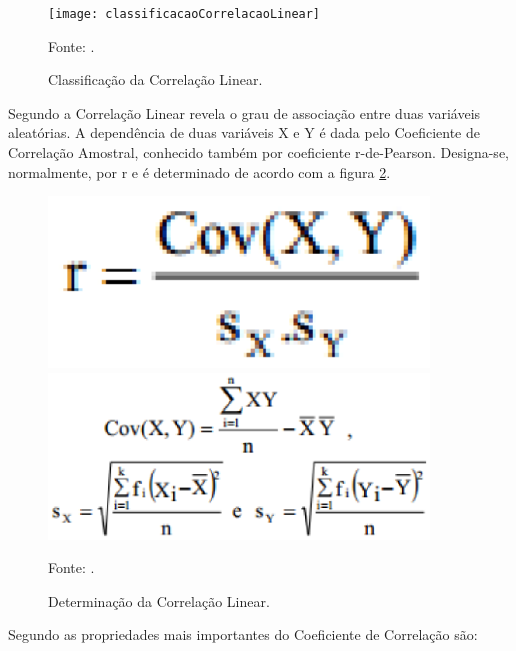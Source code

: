 \graphicspath{{figuras/}}
\begin{figure}[htp]
\centering
\texttt{[image: classificacaoCorrelacaoLinear]}
\caption{Classificação da Correlação Linear.}{Fonte: .} 
\label{classificacaoCorrelacaoLinear}
\end{figure}

Segundo  a Correlação Linear revela o grau de associação entre duas variáveis aleatórias. A dependência de duas variáveis X e Y é dada pelo Coeficiente de Correlação Amostral, conhecido também por coeficiente r-de-Pearson. Designa-se, normalmente, por r e é determinado de acordo com a figura \ref{determinacaoCorrelacao}.

\begin{figure}[htp]
\centering
\includegraphics[width=0.9\textwidth]{figuras/determinacaoCorrelacao1}
\includegraphics[width=0.9\textwidth]{figuras/determinacaoCorrelacao2}
\caption{Determinação da Correlação Linear.}{Fonte: .}
\label{determinacaoCorrelacao}
\end{figure}

Segundo  as propriedades mais importantes do Coeficiente de Correlação são:

